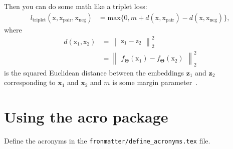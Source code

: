 Then you can do some math like a triplet loss: 
\begin{equation}
\begin{split}
l_{\textrm{triplet}}(\boldsymbol{\mathrm{x}}, \boldsymbol{\mathrm{x}}_{\textrm{pair}}, \boldsymbol{\mathrm{x}}_{\textrm{neg}}) & = \mathrm{max}\{0, m+d(\boldsymbol{\mathrm{x}}, \boldsymbol{\mathrm{x}}_{\textrm{pair}})-d(\boldsymbol{\mathrm{x}}, \boldsymbol{\mathrm{x}}_{\textrm{neg}})\},
\end{split}	
\end{equation} 
where 
\begin{equation}
\begin{split}
d(\boldsymbol{\mathrm{x}}_{1}, \boldsymbol{\mathrm{x}}_{2}) & = \begin{Vmatrix}\boldsymbol{\mathrm{z}}_{1} - \boldsymbol{\mathrm{z}}_{2}\end{Vmatrix}_2^2 \\
& = \begin{Vmatrix}f_{\boldsymbol{\Theta}}(\boldsymbol{\mathrm{x}}_{1}) - f_{\boldsymbol{\Theta}}(\boldsymbol{\mathrm{x}}_{2})\end{Vmatrix}_2^2
\end{split}	
\end{equation} is the squared Euclidean distance between the embeddings $\mathbf{z}_1$ and $\mathbf{z}_2$ corresponding to $\mathbf{x}_1$ and $\mathbf{x}_2$ and $m$ is some margin parameter~\cite{wang_learning_2014,hermann_multilingual_2014}.

\section{Using the acro package}
\label{sec:acro}

Define the acronyms in the \verb+fronmatter/define_acronyms.tex+ file. 

